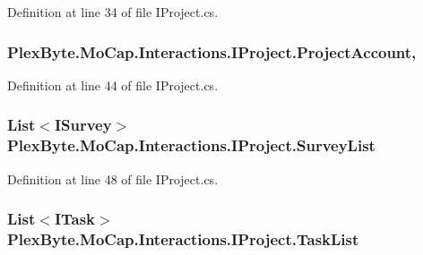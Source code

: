 Definition at line 34 of file I\+Project.\+cs.

\subsubsection[{\texorpdfstring{Project\+Account}{ProjectAccount}}]{ Plex\+Byte.\+Mo\+Cap.\+Interactions.\+I\+Project.\+Project\+Account\hspace{0.3cm}{\ttfamily [get]}, {\ttfamily [set]}}\hypertarget{interface_plex_byte_1_1_mo_cap_1_1_interactions_1_1_i_project_a617958b9559bd24c0c6827e0827bd26f}{}\label{interface_plex_byte_1_1_mo_cap_1_1_interactions_1_1_i_project_a617958b9559bd24c0c6827e0827bd26f}


Definition at line 44 of file I\+Project.\+cs.

\subsubsection[{\texorpdfstring{Survey\+List}{SurveyList}}]{\setlength{\rightskip}{0pt plus 5cm}List$<${\bf I\+Survey}$>$ Plex\+Byte.\+Mo\+Cap.\+Interactions.\+I\+Project.\+Survey\+List\hspace{0.3cm}{\ttfamily [get]}}\hypertarget{interface_plex_byte_1_1_mo_cap_1_1_interactions_1_1_i_project_a697de4384c6cf9e64a8242011da303c4}{}\label{interface_plex_byte_1_1_mo_cap_1_1_interactions_1_1_i_project_a697de4384c6cf9e64a8242011da303c4}


Definition at line 48 of file I\+Project.\+cs.

\subsubsection[{\texorpdfstring{Task\+List}{TaskList}}]{\setlength{\rightskip}{0pt plus 5cm}List$<${\bf I\+Task}$>$ Plex\+Byte.\+Mo\+Cap.\+Interactions.\+I\+Project.\+Task\+List\hspace{0.3cm}{\ttfamily [get]}}\hypertarget{interface_plex_byte_1_1_mo_cap_1_1_interactions_1_1_i_project_a5c3f958126f3834f218b8b1302ef19a6}{}\label{interface_plex_byte_1_1_mo_cap_1_1_interactions_1_1_i_project_a5c3f958126f3834f218b8b1302ef19a6}


